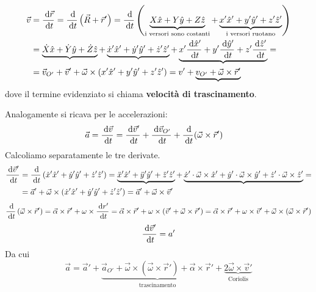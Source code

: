 \documentclass{article}
\theoremstyle{plain}
\begin{document}
\[\begin{aligned}\vec v&=\frac{\:\text{d} \vec r}{\:\text{d} t}=\frac{\:\text{d}}{\:\text{d} t}\left( \vec R+\vec r' \right)= \frac{\:\text{d}}{\:\text{d} t}\left( \underbrace{X\hat x+Y\hat y+Z\hat z}_\text{i versori sono costanti} + \underbrace{x'\hat x'+y'\hat y' +z'\hat z'}_\text{i versori ruotano} \right)\\&= \underbrace{\dot X\hat x+\dot Y\hat y+\dot Z\hat z}+\underbrace{\dot x'\hat x'+\dot y'\hat y' +\dot z'\hat z'}+\underbrace{x'\frac{\:\text{d}\hat x'}{\:\text{d} t}+y'\frac{\:\text{d}\hat y'}{\:\text{d} t} +z'\frac{\:\text{d}\hat z'}{\:\text{d} t}}=\\&=\vec v_{O'}+\vec v'+\vec \omega\times \left( x'\hat x'+ y'\hat y' + z'\hat z' \right)=v'+\underbrace{v_{O'}+\vec \omega\times \vec r'}\end{aligned}\]
dove il termine evidenziato si chiama \textbf{velocità di trascinamento}.

Analogamente si ricava per le accelerazioni:
\[\begin{aligned}
    \vec a&=\frac{\:\text{d} \vec v}{\:\text{d} t}=\frac{\:\text{d} \vec v'}{\:\text{d} t}+\frac{\:\text{d} \vec v_{O'}}{\:\text{d} t}+\frac{\:\text{d}}{\:\text{d} t}(\vec\omega \times \vec r')
\end{aligned}\]
Calcoliamo separatamente le tre derivate. 
\[\begin{aligned}
    \frac{\:\text{d}\vec v'}{\:\text{d} t}&=\frac{\:\text{d}}{\:\text{d} t}\left( \dot x'\hat x'+\dot y'\hat y' +\dot z'\hat z' \right)=\underbrace{\ddot x'\hat x'+\ddot y'\hat y' +\ddot z'\hat z'}+\underbrace{\dot x'\cdot \vec \omega \times \hat x'+\dot y'\cdot \vec \omega \times\hat y' +\dot z'\cdot \vec \omega \times\hat z'}=\\&=\vec a'+\vec \omega\times (\dot x'\hat x'+\dot y'\hat y' +\dot z'\hat z')=\vec a'+\vec \omega \times \vec v'
\end{aligned}\]
\[\begin{aligned}
    \frac{\:\text{d}}{\:\text{d} t}\left( \vec \omega \times \vec r' \right)=\vec\alpha \times\vec r'+\omega \times \frac{\:\text{d} r'}{\:\text{d} t}=\vec\alpha \times\vec r'+\omega \times \left( \vec v' +\vec \omega \times \vec r' \right)=\vec\alpha \times\vec r'+\omega \times \vec v' +\vec\omega\times\left(  \vec \omega \times \vec r'\right)
\end{aligned}
\]
\[\frac{\:\text{d} \vec v'}{\:\text{d} t}=a'\]
Da cui
\begin{equation}\vec a=\vec a'+\underbrace{\vec a_{O'}+\vec \omega\times \left( \vec\omega  \times \vec r '\right)+\vec \alpha\times  \vec r'}_\text{trascinamento}+\underbrace{2\vec \omega \times \vec v'}_\text{Coriolis}\label{eq: accelerazione sdr}\end{equation}
\end{document}
